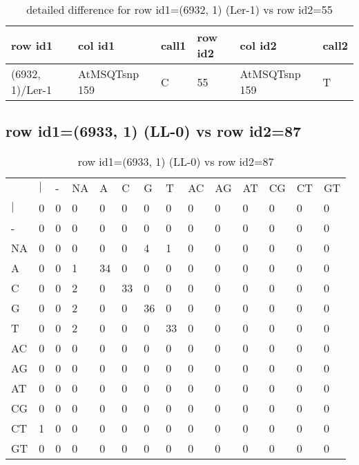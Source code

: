 \begin{center}
\begin{longtable}{|l|l|l|l|l|l|}
\caption{detailed difference for row id1=(6932, 1) (Ler-1) vs row id2=55} \label{table_dm127}\\
\hline
row id1&col id1&call1&row id2&col id2&call2\\
\hline
(6932, 1)/Ler-1&AtMSQTsnp 159&C&55&AtMSQTsnp 159&T\\
\hline
\end{longtable}
\end{center}

\subsection{row id1=(6933, 1) (LL-0) vs row id2=87}
\begin{center}
\begin{longtable}{|l|l|l|l|l|l|l|l|l|l|l|l|l|l|}
\caption{row id1=(6933, 1) (LL-0) vs row id2=87} \label{table_dm128}\\
\hline
\\
\hline
&$|$&-&NA&A&C&G&T&AC&AG&AT&CG&CT&GT\\
$|$&0&0&0&0&0&0&0&0&0&0&0&0&0\\
-&0&0&0&0&0&0&0&0&0&0&0&0&0\\
NA&0&0&0&0&0&4&1&0&0&0&0&0&0\\
A&0&0&1&34&0&0&0&0&0&0&0&0&0\\
C&0&0&2&0&33&0&0&0&0&0&0&0&0\\
G&0&0&2&0&0&36&0&0&0&0&0&0&0\\
T&0&0&2&0&0&0&33&0&0&0&0&0&0\\
AC&0&0&0&0&0&0&0&0&0&0&0&0&0\\
AG&0&0&0&0&0&0&0&0&0&0&0&0&0\\
AT&0&0&0&0&0&0&0&0&0&0&0&0&0\\
CG&0&0&0&0&0&0&0&0&0&0&0&0&0\\
CT&1&0&0&0&0&0&0&0&0&0&0&0&0\\
GT&0&0&0&0&0&0&0&0&0&0&0&0&0\\
\hline
\end{longtable}
\end{center}

